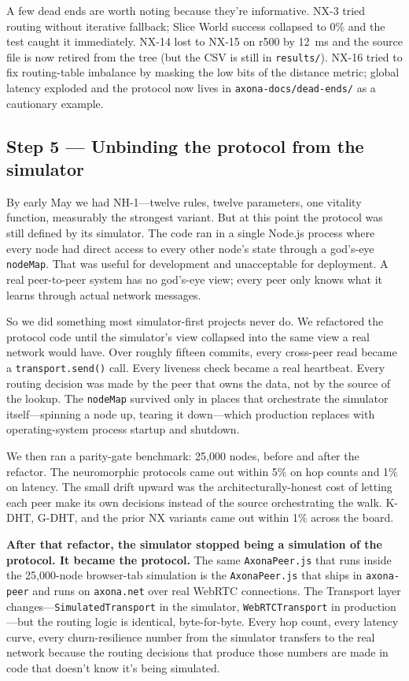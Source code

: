 \documentclass[nobib]{tufte-handout}
\begin{document}
A few dead ends are worth noting because they're informative. NX-3 tried routing without iterative fallback; Slice World success collapsed to 0\% and the test caught it immediately. NX-14 lost to NX-15 on r500 by 12~ms and the source file is now retired from the tree (but the CSV is still in \texttt{results/}). NX-16 tried to fix routing-table imbalance by masking the low bits of the distance metric; global latency exploded and the protocol now lives in \texttt{axona-docs/dead-ends/} as a cautionary example.

\subsection*{Step 5 --- Unbinding the protocol from the simulator}

By early May we had NH-1---twelve rules, twelve parameters, one vitality function, measurably the strongest variant. But at this point the protocol was still defined by its simulator. The code ran in a single Node.js process where every node had direct access to every other node's state through a god's-eye \texttt{nodeMap}. That was useful for development and unacceptable for deployment. A real peer-to-peer system has no god's-eye view; every peer only knows what it learns through actual network messages.

So we did something most simulator-first projects never do. We refactored the protocol code until the simulator's view collapsed into the same view a real network would have. Over roughly fifteen commits, every cross-peer read became a \texttt{transport.send()} call. Every liveness check became a real heartbeat. Every routing decision was made by the peer that owns the data, not by the source of the lookup. The \texttt{nodeMap} survived only in places that orchestrate the simulator itself---spinning a node up, tearing it down---which production replaces with operating-system process startup and shutdown.

We then ran a parity-gate benchmark: 25{,}000 nodes, before and after the refactor. The neuromorphic protocols came out within 5\% on hop counts and 1\% on latency. The small drift upward was the architecturally-honest cost of letting each peer make its own decisions instead of the source orchestrating the walk. K-DHT, G-DHT, and the prior NX variants came out within 1\% across the board.

\textbf{After that refactor, the simulator stopped being a simulation of the protocol. It became the protocol.} The same \texttt{AxonaPeer.js} that runs inside the 25{,}000-node browser-tab simulation is the \texttt{AxonaPeer.js} that ships in \texttt{axona-peer} and runs on \texttt{axona.net} over real WebRTC connections. The Transport layer changes---\texttt{SimulatedTransport} in the simulator, \texttt{WebRTCTransport} in production---but the routing logic is identical, byte-for-byte. Every hop count, every latency curve, every churn-resilience number from the simulator transfers to the real network because the routing decisions that produce those numbers are made in code that doesn't know it's being simulated.
\end{document}
